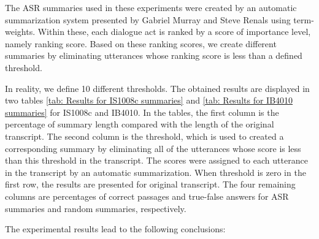 The ASR summaries used in these experiments were created by an automatic summarization system presented by Gabriel Murray and Steve Renals \cite{ASR_summaries} using term-weights. Within these, each dialogue act is ranked by a score of importance level, namely ranking score. Based on these ranking scores, we create different summaries by eliminating utterances whose ranking score is less than a defined threshold.

In reality, we define 10 different thresholds. The obtained results are displayed in two tables \ref{tab: Results for IS1008c summaries} and \ref{tab: Results for IB4010 summaries} for IS1008c and IB4010. In the tables, the first column is the percentage of summary length compared with the length of the original transcript. The second column is the threshold, which is used to created a corresponding summary by eliminating all of the utterances whose score is less than this threshold in the transcript. The scores were assigned to each utterance in the transcript by an automatic summarization. When threshold is zero in the first row, the results are presented for original transcript. The four remaining columns are percentages of correct passages and true-false answers for ASR summaries and random summaries, respectively. 

The experimental results lead to the following conclusions:

